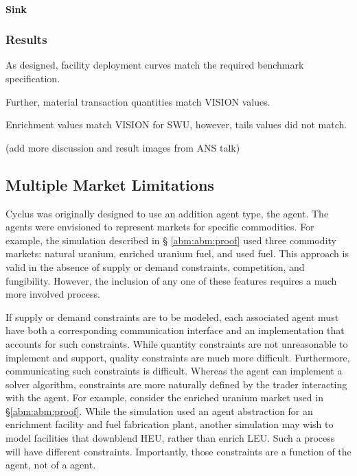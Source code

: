 \paragraph{Sink}

\subsubsection{Results}

As designed, facility deployment curves match the required benchmark specification. 

Further, material transaction quantities match VISION values.

Enrichment values match VISION for SWU, however, tails values did not match.

(add more discussion and result images from ANS talk)

\subsection{Multiple Market Limitations}\label{abm:abm:limits}

Cyclus was originally designed to use an addition agent type, the 
agent. The  agents were envisioned to represent markets for
specific commodities. For example, the simulation described in \S
\ref{abm:abm:proof} used three commodity markets: natural uranium, enriched
uranium fuel, and used fuel. This approach is valid in the absence of supply or
demand constraints, competition, and fungibility. However, the inclusion of any
one of these features requires a much more involved process.

If supply or demand constraints are to be modeled, each
associated  agent must have both a corresponding communication
interface and an implementation that accounts for such constraints. While
quantity constraints are not unreasonable to implement and support, quality
constraints are much more difficult. Furthermore, communicating such constraints
is difficult. Whereas the  agent can implement a solver algorithm,
constraints are more naturally defined by the trader interacting with the
 agent. For example, consider the enriched uranium market used in
\S \ref{abm:abm:proof}. While the simulation used an agent abstraction for an
enrichment facility and fuel fabrication plant, another simulation may wish to
model facilities that downblend HEU, rather than enrich LEU. Such a process will
have different constraints. Importantly, those constraints are a function of the
 agent, not of a  agent.

